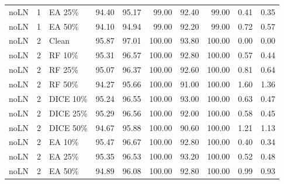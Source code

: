{\begin{longtable}{rllrrrrrrr}
noLN & 1 & EA 25\% & 94.40 & 95.17 & 99.00 & 92.40 & 99.00 & 0.41 & 0.35 \\
noLN & 1 & EA 50\% & 94.10 & 94.94 & 99.00 & 92.20 & 99.00 & 0.72 & 0.57 \\
noLN & 2 & Clean & 95.87 & 97.01 & 100.00 & 93.80 & 100.00 & 0.00 & 0.00 \\
noLN & 2 & RF 10\% & 95.31 & 96.57 & 100.00 & 92.80 & 100.00 & 0.57 & 0.44 \\
noLN & 2 & RF 25\% & 95.07 & 96.37 & 100.00 & 92.60 & 100.00 & 0.81 & 0.64 \\
noLN & 2 & RF 50\% & 94.27 & 95.66 & 100.00 & 91.00 & 100.00 & 1.60 & 1.36 \\
noLN & 2 & DICE 10\% & 95.24 & 96.55 & 100.00 & 93.00 & 100.00 & 0.63 & 0.47 \\
noLN & 2 & DICE 25\% & 95.29 & 96.56 & 100.00 & 92.00 & 100.00 & 0.58 & 0.45 \\
noLN & 2 & DICE 50\% & 94.67 & 95.88 & 100.00 & 90.60 & 100.00 & 1.21 & 1.13 \\
noLN & 2 & EA 10\% & 95.47 & 96.67 & 100.00 & 92.80 & 100.00 & 0.40 & 0.34 \\
noLN & 2 & EA 25\% & 95.35 & 96.53 & 100.00 & 93.20 & 100.00 & 0.52 & 0.48 \\
noLN & 2 & EA 50\% & 94.89 & 96.08 & 100.00 & 92.80 & 100.00 & 0.99 & 0.93 \\
\end{longtable}
}

